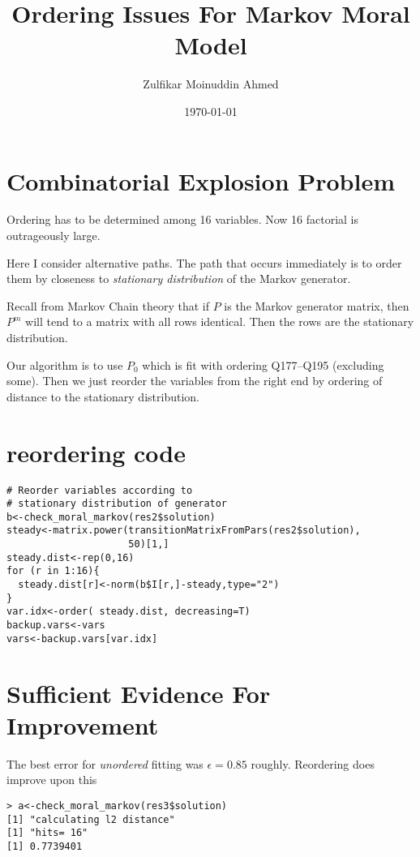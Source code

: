 \documentclass{amsart}
\title{Ordering Issues For Markov Moral Model}
\author{Zulfikar Moinuddin Ahmed}
\date{\today}
\begin{document}
\maketitle

\section{Combinatorial Explosion Problem}

Ordering has to be determined among 16 variables.  Now 16 factorial is outrageously large.

Here I consider alternative paths.  The path that occurs immediately is to order them by closeness to {\em stationary distribution} of the Markov generator. 

Recall from Markov Chain theory that if $P$ is the Markov generator matrix, then 
$P^m$ will tend to a matrix with all rows identical.  Then the rows are the stationary distribution.

Our algorithm is to use $P_0$ which is fit with ordering Q177--Q195 (excluding some).  Then we just reorder the variables from the right end by ordering of distance to the stationary distribution.

\section{reordering code}

\begin{verbatim}
# Reorder variables according to
# stationary distribution of generator
b<-check_moral_markov(res2$solution)
steady<-matrix.power(transitionMatrixFromPars(res2$solution),
                     50)[1,]
steady.dist<-rep(0,16)
for (r in 1:16){ 
  steady.dist[r]<-norm(b$I[r,]-steady,type="2")
}
var.idx<-order( steady.dist, decreasing=T)
backup.vars<-vars
vars<-backup.vars[var.idx]
\end{verbatim}

\section{Sufficient Evidence For Improvement}

The best error for {\em unordered} fitting was $\epsilon=0.85$ roughly.  Reordering does improve upon this

\begin{verbatim}
> a<-check_moral_markov(res3$solution)
[1] "calculating l2 distance"
[1] "hits= 16"
[1] 0.7739401
\end{verbatim}
\end{document}
